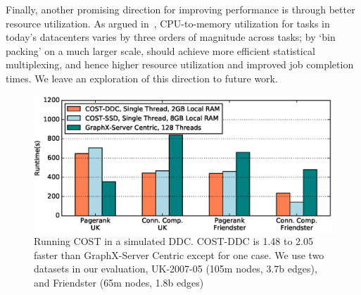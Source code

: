 Finally, another promising direction for improving performance is through better resource utilization. As argued in~\cite{hotnets, ddcHwDesign1}, CPU-to-memory utilization for tasks in today’s datacenters varies by three orders of magnitude across tasks; by `bin packing' on a much larger scale, \dis should achieve more efficient statistical multiplexing, and hence higher resource utilization and improved job completion times. We leave an exploration of this direction to future work. 


\begin{figure}
  \centering
    \includegraphics[width = \columnwidth]{img/benefit_uk.eps} 
  \caption{\small{Running COST in a simulated DDC. COST-DDC is 1.48 to 2.05 faster than GraphX-Server Centric except for one case. We use two datasets in our evaluation, UK-2007-05 (105m nodes, 3.7b edges), and Friendster (65m nodes, 1.8b edges)}}
  \label{fig:benefit}
\end{figure}
